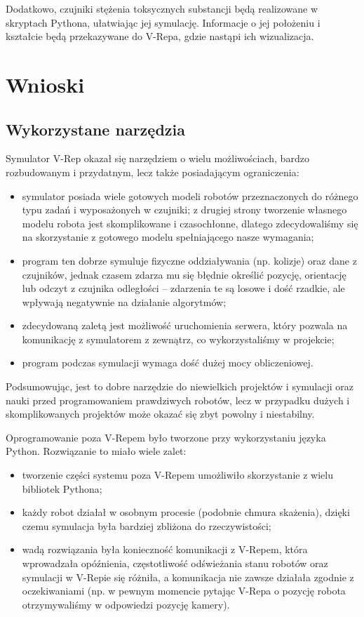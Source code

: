 \documentclass[a4paper, 12pt]{article}
\begin{document}
	
	Dodatkowo, czujniki stężenia toksycznych substancji będą realizowane w skryptach Pythona, ułatwiając jej symulację. Informacje o jej położeniu i kształcie będą przekazywane do V-Repa, gdzie nastąpi ich wizualizacja.
	
	
	\section{Wnioski}
	\subsection{Wykorzystane narzędzia}
	Symulator V-Rep okazał się narzędziem o wielu możliwościach, bardzo rozbudowanym i przydatnym, lecz także posiadającym ograniczenia:
	\begin{itemize}
		\item symulator posiada wiele gotowych modeli robotów przeznaczonych do różnego typu zadań i wyposażonych w czujniki; z drugiej strony tworzenie własnego modelu robota jest skomplikowane i czasochłonne, dlatego zdecydowaliśmy się na skorzystanie z gotowego modelu spełniającego nasze wymagania;
		\item program ten dobrze symuluje fizyczne oddziaływania (np. kolizje) oraz dane z czujników, jednak czasem zdarza mu się błędnie określić pozycję, orientację lub odczyt z czujnika odległości -- zdarzenia te są losowe i dość rzadkie, ale wpływają negatywnie na działanie algorytmów;
		\item zdecydowaną zaletą jest możliwość uruchomienia serwera, który pozwala na komunikację z symulatorem z zewnątrz, co wykorzystaliśmy w projekcie;
		\item program podczas symulacji wymaga dość dużej mocy obliczeniowej.
	\end{itemize}
	Podsumowując, jest to dobre narzędzie do niewielkich projektów i symulacji oraz nauki przed programowaniem prawdziwych robotów, lecz w przypadku dużych i skomplikowanych projektów może okazać się zbyt powolny i niestabilny.
	
	Oprogramowanie poza V-Repem było tworzone przy wykorzystaniu języka Python. Rozwiązanie to miało wiele zalet:
	\begin{itemize}
		\item tworzenie części systemu poza V-Repem umożliwiło skorzystanie z wielu bibliotek Pythona;
		\item każdy robot działał w osobnym procesie (podobnie chmura skażenia), dzięki czemu symulacja była bardziej zbliżona do rzeczywistości;
		\item wadą rozwiązania była konieczność komunikacji z V-Repem, która wprowadzała opóźnienia, częstotliwość odświeżania stanu robotów oraz symulacji w V-Repie się różniła, a komunikacja nie zawsze działała zgodnie z oczekiwaniami (np. w pewnym momencie pytając V-Repa o pozycję robota otrzymywaliśmy w odpowiedzi pozycję kamery).
	\end{itemize}
	
\end{document}
